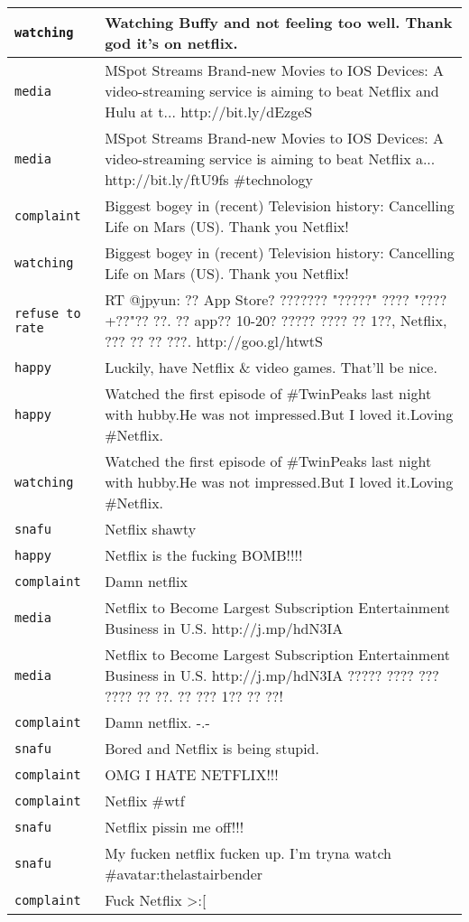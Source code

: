 \begin{center}
\begin{longtable}{|l|p{120mm}|}
      \tabularnewline\hline
         \texttt{watching} & Watching Buffy and not feeling too well. Thank god it's on netflix.
      \tabularnewline\hline
         \texttt{media} & MSpot Streams Brand-new Movies to IOS Devices: A video-streaming service is aiming to beat Netflix and Hulu at t... http://bit.ly/dEzgeS
      \tabularnewline\hline
         \texttt{media} & MSpot Streams Brand-new Movies to IOS Devices: A video-streaming service is aiming to beat Netflix a... http://bit.ly/ftU9fs \#technology
      \tabularnewline\hline
         \texttt{complaint} & Biggest bogey in (recent) Television history: Cancelling Life on Mars (US). Thank you Netflix!
      \tabularnewline\hline
         \texttt{watching} & Biggest bogey in (recent) Television history: Cancelling Life on Mars (US). Thank you Netflix!
      \tabularnewline\hline
         \texttt{refuse to rate} & RT @jpyun: ?? App Store? ??????? "?????" ???? "????+??"?? ??. ?? app?? 10-20? ????? ???? ?? 1??, Netflix, ??? ?? ?? ???. http://goo.gl/htwtS
      \tabularnewline\hline
         \texttt{happy} & Luckily, have Netflix \& video games. That'll be nice.
      \tabularnewline\hline
         \texttt{happy} & Watched the first episode of \#TwinPeaks last night with hubby.He was not impressed.But I loved it.Loving \#Netflix.
      \tabularnewline\hline
         \texttt{watching} & Watched the first episode of \#TwinPeaks last night with hubby.He was not impressed.But I loved it.Loving \#Netflix.
      \tabularnewline\hline
         \texttt{snafu} & Netflix shawty
      \tabularnewline\hline
         \texttt{happy} & Netflix is the fucking BOMB!!!!
      \tabularnewline\hline
         \texttt{complaint} & Damn netflix
      \tabularnewline\hline
         \texttt{media} & Netflix to Become Largest Subscription Entertainment Business in U.S. http://j.mp/hdN3IA
      \tabularnewline\hline
         \texttt{media} & Netflix to Become Largest Subscription Entertainment Business in U.S. http://j.mp/hdN3IA ????? ???? ??? ???? ?? ??. ?? ??? 1?? ?? ??!
      \tabularnewline\hline
         \texttt{complaint} & Damn netflix. -.-
      \tabularnewline\hline
         \texttt{snafu} & Bored and Netflix is being stupid.
      \tabularnewline\hline
         \texttt{complaint} & OMG I HATE NETFLIX!!!
      \tabularnewline\hline
         \texttt{complaint} & Netflix \#wtf
      \tabularnewline\hline
         \texttt{snafu} & Netflix pissin me off!!!
      \tabularnewline\hline
         \texttt{snafu} & My fucken netflix fucken up. I'm tryna watch \#avatar:thelastairbender
      \tabularnewline\hline
         \texttt{complaint} & Fuck Netflix >:[

\end{longtable}
\end{center}
